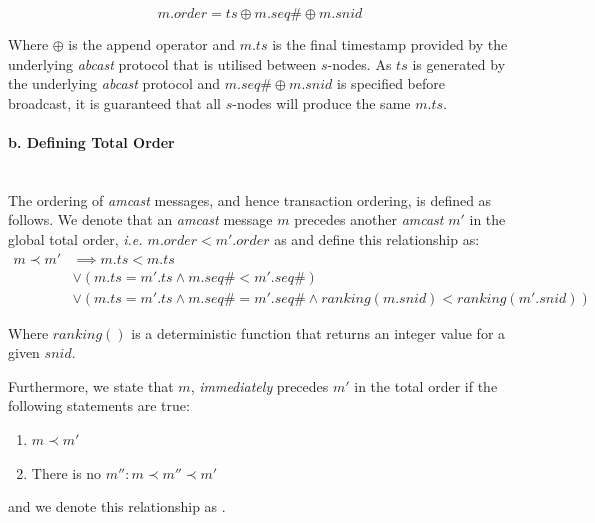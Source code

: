 \begin{enumerate}
        \begin{equation*}
            m.order = ts\oplus m.seq\# \oplus m.snid
        \end{equation*}        		
		
        Where $\oplus$ is the append operator and $m.ts$ is the final timestamp provided by the underlying \emph{abcast} protocol that is utilised between $s$-nodes.  As $ts$ is generated by the underlying \emph{abcast} protocol and $m.seq\# \oplus m.snid$ is specified before broadcast, it is guaranteed that all $s$-nodes will produce the same $m.ts$.  
        
        \paragraph{b. Defining Total Order} \hfill \\
        The ordering of \emph{amcast} messages, and hence transaction ordering, is defined as follows.  We denote that an \emph{amcast} message $m$ precedes another \emph{amcast} $m'$ in the global total order, \emph{i.e. $m.order < m'.order$} as   and define this relationship as:
        \begin{equation*}
            \begin{split}
                   m \prec m' &\implies  m.ts < m.ts \\
                   & \lor \left(m.ts = m'.ts  \land m.seq\# < m'.seq\#\right) \\
                   & \lor \left(m.ts = m'.ts  \land m.seq\# = m'.seq\# \land ranking(m.snid) < ranking(m'.snid) \right)
            \end{split}
        \end{equation*}
        
        Where $ranking()$ is a deterministic function that returns an integer value for a given $snid$.  
                
        Furthermore, we state that $m$, \emph{immediately} precedes $m'$ in the total order if the following statements are true:
        
        \begin{enumerate}[label={(\roman*)}, leftmargin=5em]
            \item    $m \prec m'$
            \item    There is no $m'' : m \prec m'' \prec m'$
        \end{enumerate}

        and we denote this relationship as .  
        

\end{enumerate}
